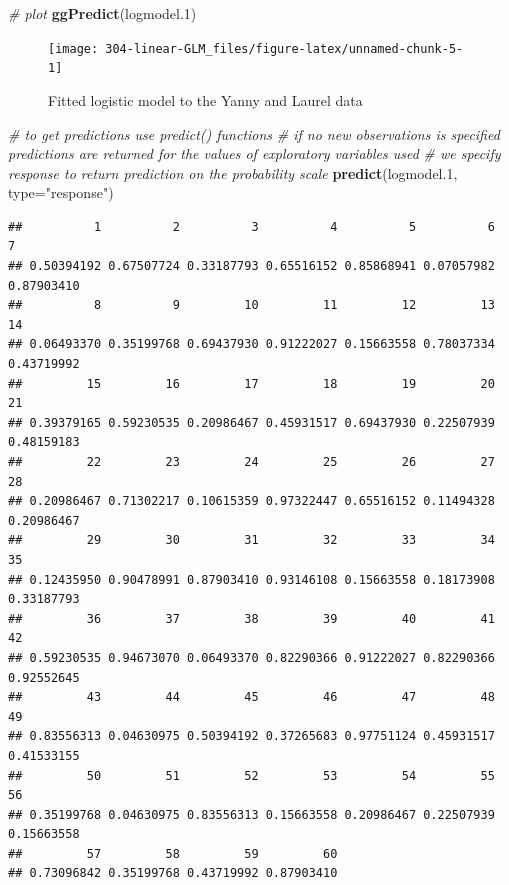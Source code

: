 \documentclass[
]{book}
\newenvironment{Shaded}{\begin{snugshade}}{\end{snugshade}}
\newcommand{\CommentTok}[1]{\textcolor[rgb]{0.56,0.35,0.01}{\textit{#1}}}
\newcommand{\DataTypeTok}[1]{\textcolor[rgb]{0.13,0.29,0.53}{#1}}
\newcommand{\FloatTok}[1]{\textcolor[rgb]{0.00,0.00,0.81}{#1}}
\newcommand{\KeywordTok}[1]{\textcolor[rgb]{0.13,0.29,0.53}{\textbf{#1}}}
\newcommand{\NormalTok}[1]{#1}
\newcommand{\StringTok}[1]{\textcolor[rgb]{0.31,0.60,0.02}{#1}}
\theoremstyle{definition}
\theoremstyle{definition}
\theoremstyle{definition}
\theoremstyle{remark}
\begin{document}
\begin{Shaded}
\begin{Highlighting}[]
\CommentTok{\# plot}
\KeywordTok{ggPredict}\NormalTok{(logmodel}\FloatTok{.1}\NormalTok{)}
\end{Highlighting}
\end{Shaded}

\begin{figure}

{\centering \texttt{[image: 304-linear-GLM\_files/figure-latex/unnamed-chunk-5-1]} 

}

\caption{Fitted logistic model to the Yanny and Laurel data}\label{fig:unnamed-chunk-5}
\end{figure}

\begin{Shaded}
\begin{Highlighting}[]
\CommentTok{\# to get predictions use predict() functions}
\CommentTok{\# if no new observations is specified predictions are returned for the values of exploratory variables used}
\CommentTok{\# we specify response to return prediction on the probability scale}
\KeywordTok{predict}\NormalTok{(logmodel}\FloatTok{.1}\NormalTok{, }\DataTypeTok{type=}\StringTok{"response"}\NormalTok{)}
\end{Highlighting}
\end{Shaded}

\begin{verbatim}
##          1          2          3          4          5          6          7 
## 0.50394192 0.67507724 0.33187793 0.65516152 0.85868941 0.07057982 0.87903410 
##          8          9         10         11         12         13         14 
## 0.06493370 0.35199768 0.69437930 0.91222027 0.15663558 0.78037334 0.43719992 
##         15         16         17         18         19         20         21 
## 0.39379165 0.59230535 0.20986467 0.45931517 0.69437930 0.22507939 0.48159183 
##         22         23         24         25         26         27         28 
## 0.20986467 0.71302217 0.10615359 0.97322447 0.65516152 0.11494328 0.20986467 
##         29         30         31         32         33         34         35 
## 0.12435950 0.90478991 0.87903410 0.93146108 0.15663558 0.18173908 0.33187793 
##         36         37         38         39         40         41         42 
## 0.59230535 0.94673070 0.06493370 0.82290366 0.91222027 0.82290366 0.92552645 
##         43         44         45         46         47         48         49 
## 0.83556313 0.04630975 0.50394192 0.37265683 0.97751124 0.45931517 0.41533155 
##         50         51         52         53         54         55         56 
## 0.35199768 0.04630975 0.83556313 0.15663558 0.20986467 0.22507939 0.15663558 
##         57         58         59         60 
## 0.73096842 0.35199768 0.43719992 0.87903410
\end{verbatim}
\end{document}
